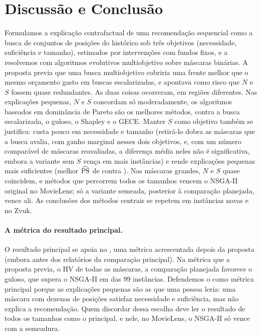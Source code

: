 \section{Discussão e Conclusão}

Formulamos a explicação contrafactual de uma recomendação sequencial como a
busca de conjuntos de posições do histórico sob três objetivos (necessidade,
suficiência e tamanho), estimados por intervenções com fundos fixos, e a
resolvemos com algoritmos evolutivos multiobjetivo sobre máscaras binárias. A
proposta previa que uma busca multiobjetivo cobriria uma frente melhor que o
mesmo orçamento gasto em buscas escalarizadas, e apontava como risco que $N$ e
$S$ fossem quase redundantes. As duas coisas ocorreram, em regiões diferentes.
Nas explicações pequenas, $N$ e $S$ concordam só moderadamente, os algoritmos
baseados em dominância de Pareto são os melhores métodos, contra a busca
escalarizada, o guloso, o Shapley e o GECE. Manter $S$ como objetivo também se
justifica: custa pouco em necessidade e tamanho (retirá-lo dobra as máscaras
que a busca avalia, com ganho marginal nesses dois objetivos, e, com um número
comparável de máscaras reavaliadas, a diferença média neles não é significativa, embora a
variante sem $S$ vença em mais instâncias) e rende explicações pequenas mais
suficientes (melhor $\widehat{\mathrm{PS}}$ de  contra
). Nas máscaras grandes, $N$ e
$S$ quase coincidem, e métodos que percorrem todos os tamanhos vencem o NSGA-II
original no MovieLens; só a variante semeada, posterior à comparação
planejada, vence ali. As conclusões dos métodos centrais se repetem em
instâncias novas e no Zvuk.

\paragraph{A métrica do resultado principal.}
O resultado principal se apoia no \HVp{}, uma métrica acrescentada depois da
proposta (embora antes dos relatórios da comparação principal). Na métrica que
a proposta previa, o HV de todas as máscaras, a comparação planejada favorece o
guloso, que supera o NSGA-II em  das 99
instâncias. Defendemos o \HVp{} como métrica principal porque as explicações
pequenas são as que uma pessoa leria: uma máscara com dezenas de posições
satisfaz necessidade e suficiência, mas não explica a recomendação. Quem
discordar dessa escolha deve ler o resultado de todos os tamanhos como o
principal, e nele, no MovieLens, o NSGA-II só vence com a semeadura.

